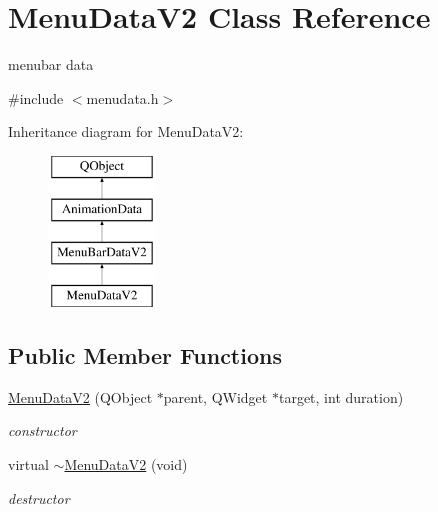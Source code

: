 \hypertarget{class_menu_data_v2}{}\section{Menu\+Data\+V2 Class Reference}
\label{class_menu_data_v2}


menubar data  




{\ttfamily \#include $<$menudata.\+h$>$}

Inheritance diagram for Menu\+Data\+V2\+:\begin{figure}[H]
\begin{center}
\leavevmode
\includegraphics[height=4.000000cm]{class_menu_data_v2}
\end{center}
\end{figure}
\subsection*{Public Member Functions}
\begin{DoxyCompactItemize}
\item 
\mbox{\label{class_menu_data_v2_a7245a433bb3fef649d93b189d4cf68c3}} 
\hyperlink{class_menu_data_v2_a7245a433bb3fef649d93b189d4cf68c3}{Menu\+Data\+V2} (Q\+Object $\ast$parent, Q\+Widget $\ast$target, int duration)
\begin{DoxyCompactList}\small\item\em constructor \end{DoxyCompactList}\item 
\mbox{\label{class_menu_data_v2_a1bb71278a6ca58bedc43d5f648a4717b}} 
virtual \hyperlink{class_menu_data_v2_a1bb71278a6ca58bedc43d5f648a4717b}{$\sim$\+Menu\+Data\+V2} (void)
\begin{DoxyCompactList}\small\item\em destructor \end{DoxyCompactList}\end{DoxyCompactItemize}

